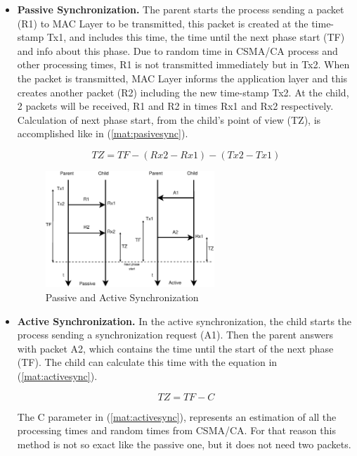 \begin{itemize}
 \item \textbf{Passive Synchronization.} The parent starts the process sending a packet (R1) to \ac{MAC} Layer to be transmitted, this packet is
created at the time-stamp Tx1, and includes this time, the time until the next phase start (TF) and info about this phase. Due to random time in 
\ac{CSMA/CA} process and other processing times, R1 is not transmitted immediately but in Tx2. When the packet is transmitted, \ac{MAC} Layer informs
the application layer and this creates another packet (R2) including the new time-stamp Tx2. At the child, 2 packets will be received, R1 and 
R2 in times Rx1 and Rx2 respectively. Calculation of next phase start, from the child's point of view (TZ), is accomplished like in (\ref{mat:pasivesync}).

\begin{equation}
  TZ = TF - (Rx2 - Rx1) - (Tx2 - Tx1)
  \label{mat:pasivesync}
\end{equation}

\begin{figure}[ht]
 \begin{center}
  \includegraphics[width=0.6\textwidth]{synchronization.eps}
 \end{center}
 \caption{Passive and Active Synchronization \cite{LPLandOLP}}
 \label{fig:synchronization}
\end{figure}
 
 \item \textbf{Active Synchronization.} In the active synchronization, the child starts the process sending a synchronization request (A1).
Then the parent answers with packet A2, which contains the time until the start of the next phase (TF). The child can calculate this time
with the equation in (\ref{mat:activesync}).

\begin{equation}
  TZ = TF - C
 \label{mat:activesync}
\end{equation}

The C parameter in (\ref{mat:activesync}), represents an estimation of all the processing times and random times from \ac{CSMA/CA}. For that reason 
this method is not so exact like the passive one, but it does not need two packets.
\end{itemize}

